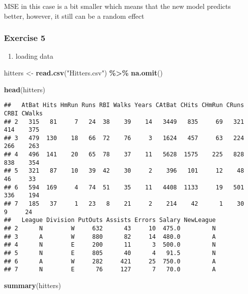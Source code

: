 \documentclass[
]{article}
\newenvironment{Shaded}{\begin{snugshade}}{\end{snugshade}}
\newcommand{\FunctionTok}[1]{\textcolor[rgb]{0.13,0.29,0.53}{\textbf{#1}}}
\newcommand{\NormalTok}[1]{#1}
\newcommand{\OtherTok}[1]{\textcolor[rgb]{0.56,0.35,0.01}{#1}}
\newcommand{\SpecialCharTok}[1]{\textcolor[rgb]{0.81,0.36,0.00}{\textbf{#1}}}
\newcommand{\StringTok}[1]{\textcolor[rgb]{0.31,0.60,0.02}{#1}}
\providecommand{\tightlist}{%
  \setlength{\itemsep}{0pt}\setlength{\parskip}{0pt}}
\begin{document}
MSE in this case is a bit smaller which means that the new model
predicts better, however, it still can be a random effect

\subsubsection{Exercise 5}\label{exercise-5}

\begin{enumerate}
\def\labelenumi{\alph{enumi}.}
\tightlist
\item
  loading data
\end{enumerate}

\begin{Shaded}
\begin{Highlighting}[]
\NormalTok{hitters }\OtherTok{\textless{}{-}} \FunctionTok{read.csv}\NormalTok{(}\StringTok{"Hitters.csv"}\NormalTok{) }\SpecialCharTok{\%\textgreater{}\%}
  \FunctionTok{na.omit}\NormalTok{()}

\FunctionTok{head}\NormalTok{(hitters)}
\end{Highlighting}
\end{Shaded}

\begin{verbatim}
##   AtBat Hits HmRun Runs RBI Walks Years CAtBat CHits CHmRun CRuns CRBI CWalks
## 2   315   81     7   24  38    39    14   3449   835     69   321  414    375
## 3   479  130    18   66  72    76     3   1624   457     63   224  266    263
## 4   496  141    20   65  78    37    11   5628  1575    225   828  838    354
## 5   321   87    10   39  42    30     2    396   101     12    48   46     33
## 6   594  169     4   74  51    35    11   4408  1133     19   501  336    194
## 7   185   37     1   23   8    21     2    214    42      1    30    9     24
##   League Division PutOuts Assists Errors Salary NewLeague
## 2      N        W     632      43     10  475.0         N
## 3      A        W     880      82     14  480.0         A
## 4      N        E     200      11      3  500.0         N
## 5      N        E     805      40      4   91.5         N
## 6      A        W     282     421     25  750.0         A
## 7      N        E      76     127      7   70.0         A
\end{verbatim}

\begin{Shaded}
\begin{Highlighting}[]
\FunctionTok{summary}\NormalTok{(hitters)}
\end{Highlighting}
\end{Shaded}
\end{document}
